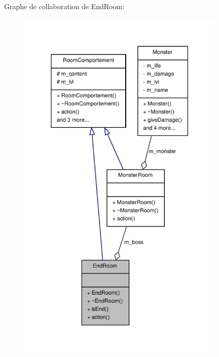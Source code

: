 Graphe de collaboration de End\-Room\-:
\nopagebreak
\begin{figure}[H]
\begin{center}
\leavevmode
\includegraphics[width=282pt]{class_end_room__coll__graph}
\end{center}
\end{figure}
